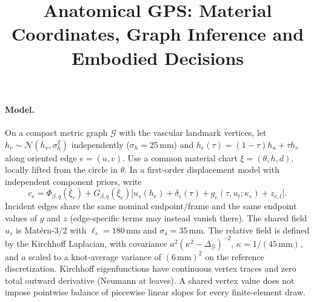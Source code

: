 \documentclass[11pt]{article}
\title{Anatomical GPS: Material Coordinates, Graph Inference and Embodied Decisions}
\author{}
\date{}
\newcommand{\G}{\mathcal G}
\begin{document}
\maketitle

\paragraph{Model.}
On a compact metric graph $\G$ with the vascular landmark vertices, let
$h_v\sim\mathcal N(\bar h_v,\sigma_h^2)$ independently ($\sigma_h=25\,\mathrm{mm}$)
and $h_e(\tau)=(1-\tau)h_u+\tau h_v$ along oriented edge $e=(u,v)$.
Use a common material chart $\xi=(\theta,h,d)$, locally lifted from the circle in $\theta$.
In a first-order displacement model with independent component priors, write
\[
 c_e=\Phi_{\beta,q}(\bar\xi_e)+G_{\beta,q}(\bar\xi_e)
 \big[u_s(h_e)+\delta_e(\tau)+g_e(\tau,u_t;\kappa_e)+z_{e,t}\big].
\]
Incident edges share the same nominal endpoint/frame and the same endpoint
values of $g$ and $z$ (edge-specific terms may instead vanish there).
The shared field $u_s$ is Mat\'ern-$3/2$ with $\ell_s=180\,\mathrm{mm}$ and
$\sigma_s=35\,\mathrm{mm}$. The relative field is defined by the Kirchhoff
Laplacian, with covariance $a^2(\kappa^2-\Delta_{\G})^{-2}$,
$\kappa=1/(45\,\mathrm{mm})$, and $a$ scaled to a knot-average variance of
$(6\,\mathrm{mm})^2$ on the reference discretization. Kirchhoff eigenfunctions
have continuous vertex traces and zero total outward derivative (Neumann at
leaves). A shared vertex value does not impose pointwise balance of piecewise
linear slopes for every finite-element draw.
\end{document}
